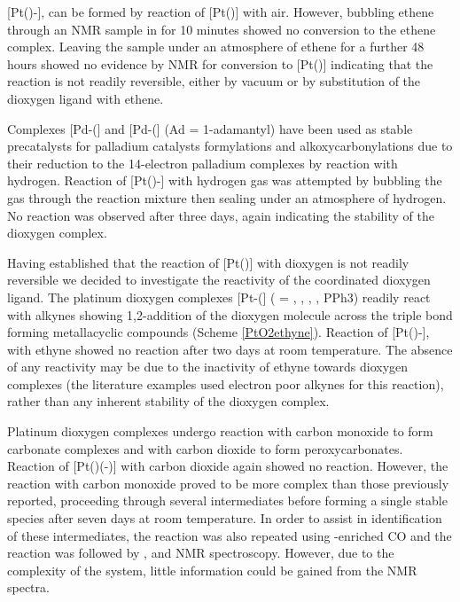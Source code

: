 [Pt(\tButhixantphos)\hapto{}-], can be formed by reaction of [Pt(\tButhixantphos)] with air.  However, bubbling ethene through an NMR sample in  for 10 minutes showed no conversion to the ethene complex.  Leaving the sample under an atmosphere of ethene for a further 48 hours showed no evidence by NMR for conversion to [Pt(\tButhixantphos)] indicating that the reaction is not readily reversible, either by vacuum or by substitution of the dioxygen ligand with ethene.  

Complexes [Pd\hapto{}-(] and [Pd\hapto{}-(] (Ad = 1-adamantyl) have been used as stable precatalysts for palladium catalysts formylations and alkoxycarbonylations due to their reduction to the 14-electron palladium complexes by reaction with hydrogen.\cite{Sergeev2010}  Reaction of [Pt(\tButhixantphos)\hapto{}-] with hydrogen gas was attempted by bubbling the gas through the reaction mixture then sealing under an atmosphere of hydrogen.  No reaction was observed after three days, again indicating the stability of the dioxygen complex.  

Having established that the reaction of [Pt(\tButhixantphos)] with dioxygen is not readily reversible we decided to investigate the reactivity of the coordinated dioxygen ligand.  The platinum dioxygen complexes [Pt\hapto{}-(] ( = , , , , PPh3) readily react with alkynes showing 1,2-addition of the dioxygen molecule across the triple bond forming metallacyclic compounds (Scheme \ref{PtO2ethyne})\cite{Clark1978}.  Reaction of [Pt(\tButhixantphos)\hapto{}-], with ethyne showed no reaction after two days at room temperature.  The absence of any reactivity may be due to the inactivity of ethyne towards dioxygen complexes (the literature examples used electron poor alkynes for this reaction), rather than any inherent stability of the dioxygen complex.  

Platinum dioxygen complexes undergo reaction with carbon monoxide to form carbonate complexes and with carbon dioxide to form peroxycarbonates.\cite{Goel1983b}  Reaction of [Pt(\tButhixantphos)(\hapto{}-)] with carbon dioxide again showed no reaction.  However, the reaction with carbon monoxide proved to be more complex than those previously reported, proceeding through several intermediates before forming a single stable species after seven days at room temperature.  In order to assist in identification of these intermediates, the reaction was also repeated using \carbon{}-enriched CO and the reaction was followed by \proton{}, \carbon{} and \phosphorus{} NMR spectroscopy.  However, due to the complexity of the system, little information could be gained from the \proton{} NMR spectra.  

